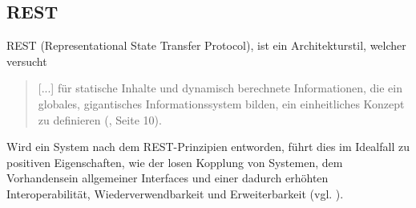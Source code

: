 \subsection{REST}\label{section:rest}
REST (Representational State Transfer Protocol), ist ein Architekturstil, welcher versucht 
\begin{quotation}
[...] für statische Inhalte und dynamisch berechnete Informationen, die ein globales, gigantisches Informationssystem bilden, ein einheitliches Konzept zu definieren (\cite{tilkovrest}, Seite 10).
\end{quotation}
Wird ein System nach dem REST-Prinzipien entworden, führt dies im Idealfall zu positiven Eigenschaften, wie der losen Kopplung von Systemen, dem Vorhandensein allgemeiner Interfaces und einer dadurch erhöhten Interoperabilität, Wiederverwendbarkeit und Erweiterbarkeit (vgl. \cite {tilkovrest}).

